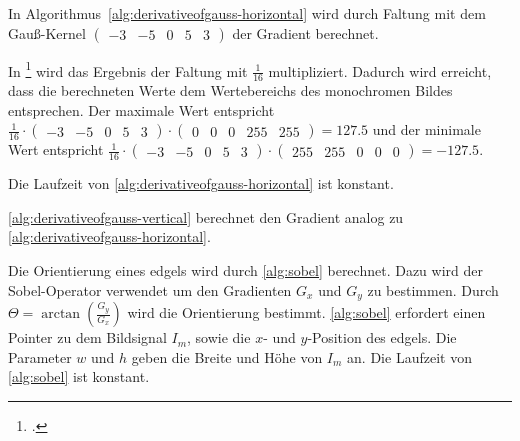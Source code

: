 In Algorithmus~\autoref{alg:derivativeofgauss-horizontal} wird durch Faltung mit dem Gauß-Kernel
$\left( \begin{smallmatrix}
-3& -5& 0& 5& 3
\end{smallmatrix} \right)$
der Gradient berechnet.



In \citeauthor{clarke96}\footcite[Vgl.][S.~417]{clarke96} wird das Ergebnis der Faltung mit $\tfrac{1}{16}$
 multipliziert. Dadurch wird erreicht, dass die berechneten Werte dem Wertebereichs des monochromen Bildes entsprechen.
 Der maximale Wert entspricht
$\tfrac{1}{16}
\cdot
\left( \begin{smallmatrix}
	-3& -5& 0& 5& 3
\end{smallmatrix} \right)
\cdot
\left( \begin{smallmatrix}
	0& 0& 0& 255& 255
\end{smallmatrix} \right)
= 127.5
$
und der minimale Wert entspricht
$\tfrac{1}{16}
\cdot
\left( \begin{smallmatrix}
	-3& -5& 0& 5& 3
\end{smallmatrix} \right)
\cdot
\left( \begin{smallmatrix}
	255& 255& 0& 0& 0
\end{smallmatrix} \right)
= -127.5 \text{.}
$

Die Laufzeit von \autoref{alg:derivativeofgauss-horizontal} ist konstant.

\autoref{alg:derivativeofgauss-vertical} berechnet den Gradient analog zu \autoref{alg:derivativeofgauss-horizontal}.

Die Orientierung eines \gls{edgels} wird durch \autoref{alg:sobel} berechnet. Dazu wird der Sobel-Operator verwendet um
 den Gradienten $G_x$ und $G_y$ zu bestimmen. Durch $\Theta = \arctan{\left(\tfrac{G_y}{G_x}\right)}$ wird die
 Orientierung bestimmt. \autoref{alg:sobel} erfordert einen Pointer zu dem Bildsignal $I_m$, sowie die $x$- und
 $y$-Position des \gls{edgels}. Die Parameter $w$ und $h$ geben die Breite und Höhe von $I_m$ an. Die Laufzeit von
 \autoref{alg:sobel} ist konstant.




